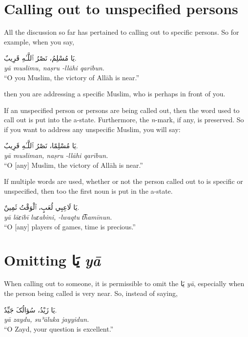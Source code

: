 \documentclass[
  10pt,
]{book}
\begin{document}
\section{Calling out to unspecified persons}\label{calling-out-to-unspecified-persons}

All the discussion so far has pertained to calling out to specific persons. So for example, when you say,

\foreignlanguage{arabic}{يَا مُسْلِمُ، نَصْرُ ٱللَّـٰهِ قَرِيبٌ.}\\
\emph{yā muslimu, naṣru -llāhi qarībun.}\\
\enquote{O you Muslim, the victory of Allāh is near.}

then you are addressing a specific Muslim, who is perhaps in front of you.

If an unspecified person or persons are being called out, then the word used to call out is put into the a-state. Furthermore, the \emph{n}-mark, if any, is preserved. So if you want to address any unspecific Muslim, you will say:

\foreignlanguage{arabic}{يَا مُسْلِمًا، نَصْرُ ٱللَّـٰهِ قَرِيبٌ.}\\
\emph{yā musliman, naṣru -llāhi qarībun.}\\
\enquote{O {[}any{]} Muslim, the victory of Allāh is near.}

If multiple words are used, whether or not the person called out to is specific or unspecified, then too the first noun is put in the a-state.

\foreignlanguage{arabic}{يَا لَاعِبِي لُعَبٍ، ٱلْوَقْتُ ثَمِينٌ.}\\
\emph{yā lāɛibī luɛabini, -lwaqtu t͡hamīnun.}\\
\enquote{O {[}any{]} players of games, time is precious.}

\section{\texorpdfstring{Omitting \foreignlanguage{arabic}{يَا} \emph{yā}}{Omitting يَا yā}}\label{omitting-ux64aux627-ya}

When calling out to someone, it is permissible to omit the \foreignlanguage{arabic}{يَا} \emph{yā}, especially when the person being called is very near. So, instead of saying,

\foreignlanguage{arabic}{يَا زَيْدُ، سُؤالُکَ جَيِّدٌ.}\\
\emph{yā zaydu, suʾāluka jayyidun.}\\
\enquote{O Zayd, your question is excellent.}
\end{document}
